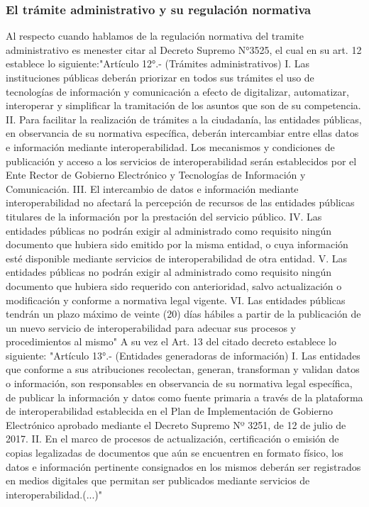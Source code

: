 \subsubsection{El trámite administrativo y su regulación normativa}
Al respecto cuando hablamos de la regulación normativa del tramite administrativo es menester citar al Decreto Supremo N°3525, el cual en su art. 12 establece lo siguiente:"Artículo 12°.- (Trámites administrativos) I. Las instituciones públicas deberán priorizar en todos sus trámites el uso de tecnologías de información y comunicación a efecto de digitalizar, automatizar, interoperar y simplificar la tramitación de los asuntos que son de su competencia. II. Para facilitar la realización de trámites a la ciudadanía, las entidades públicas, en observancia de su normativa específica, deberán intercambiar entre ellas datos e información mediante interoperabilidad. Los mecanismos y condiciones de publicación y acceso a los servicios de interoperabilidad serán establecidos por el Ente Rector de Gobierno Electrónico y Tecnologías de Información y Comunicación. III. El intercambio de datos e información mediante interoperabilidad no afectará la percepción de recursos de las entidades públicas titulares de la información por la prestación del servicio público. IV. Las entidades públicas no podrán exigir al administrado como requisito ningún documento que hubiera sido emitido por la misma entidad, o cuya información esté disponible mediante servicios de interoperabilidad de otra entidad. V. Las entidades públicas no podrán exigir al administrado como requisito ningún documento que hubiera sido requerido con anterioridad, salvo actualización o modificación y conforme a normativa legal vigente. VI. Las entidades públicas tendrán un plazo máximo de veinte (20) días hábiles a partir de la publicación de un nuevo servicio de interoperabilidad para adecuar sus procesos y procedimientos al mismo" A su vez el Art. 13 del citado decreto establece lo siguiente: "Artículo 13°.- (Entidades generadoras de información) I. Las entidades que conforme a sus atribuciones recolectan, generan, transforman y validan datos o información, son responsables en observancia de su normativa legal específica, de publicar la información y datos como fuente primaria a través de la plataforma de interoperabilidad establecida en el Plan de Implementación de Gobierno Electrónico aprobado mediante el Decreto Supremo Nº 3251, de 12 de julio de 2017. II. En el marco de procesos de actualización, certificación o emisión de copias legalizadas de documentos que aún se encuentren en formato físico, los datos e información pertinente consignados en los mismos deberán ser registrados en medios digitales que permitan ser publicados mediante servicios de interoperabilidad.(...)"
